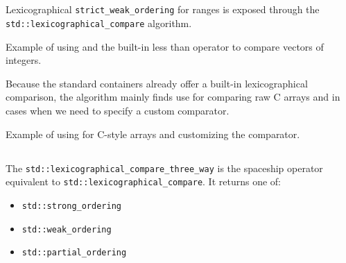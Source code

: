 \subsection{\texorpdfstring{}{\texttt{std::lexicographical\_compare}}}

Lexicographical \texttt{strict\_weak\_ordering} for ranges is exposed through the \newline\texttt{std::lexicographical\_compare} algorithm.



\begin{codebox}[breakable]{\href{https://compiler-explorer.com/z/38vdfe8vo}{\ExternalLink}}
\footnotesize Example of using  and the built-in less than operator to compare vectors of integers.
\tcblower
{}
\end{codebox}

Because the standard containers already offer a built-in lexicographical comparison, the algorithm mainly finds use for comparing raw C arrays and in cases when we need to specify a custom comparator.

\begin{codebox}[]{\href{https://compiler-explorer.com/z/Ydedor1cr}{\ExternalLink}}
\footnotesize Example of using  for C-style arrays and customizing the comparator.
\tcblower
{}
\end{codebox}

\subsection{\texorpdfstring{}{\texttt{std::lexicographical\_compare\_three\_way}}}

The \texttt{std::lexicographical\_compare\_three\_way} is the spaceship operator equivalent to \texttt{std::lexicographical\_compare}. It returns one of:
\begin{itemize}
    \item\texttt{std::strong\_ordering}
    \item \texttt{std::weak\_ordering}
    \item \texttt{std::partial\_ordering}
\end{itemize}


